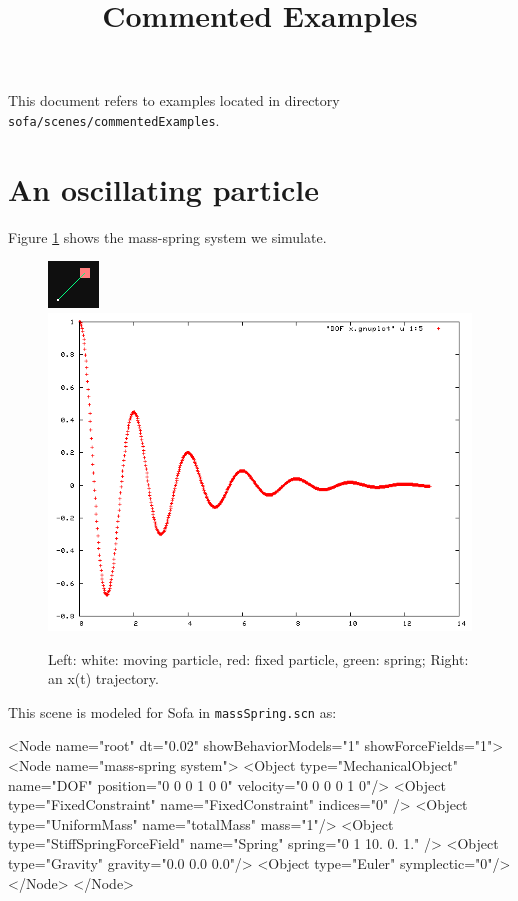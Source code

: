 \documentclass[a4paper,11pt]{article}
\title{Commented Examples}
\author{
}
\newcommand{\file}[1]{\texttt{#1}}
\begin{document}
\maketitle

% 

This document refers to examples located in directory \texttt{sofa/scenes/commentedExamples}.

\tableofcontents

\section{An oscillating particle}
Figure \ref{fig:massSpring} shows the mass-spring system we simulate.
\begin{figure}[ht]
	\centering
	\includegraphics[width=0.4\linewidth]{massSpring01}
 \includegraphics[height=0.4\linewidth]{euler_damped_ok}
	\caption{Left: white: moving particle, red: fixed particle, green: spring; Right: an x(t) trajectory.}
	\label{fig:massSpring}
\end{figure}

This scene is modeled for Sofa in \file{massSpring.scn} as:
\begin{code_xml}
<Node name="root" dt="0.02" showBehaviorModels="1" showForceFields="1">
   <Node name="mass-spring system">
      <Object type="MechanicalObject" name="DOF" position="0 0 0  1 0 0" velocity="0 0 0  0 1 0"/>
      <Object type="FixedConstraint" name="FixedConstraint" indices="0" />
      <Object type="UniformMass" name="totalMass" mass="1"/>
      <Object type="StiffSpringForceField" name="Spring" spring="0 1 10. 0. 1." />
      <Object type="Gravity" gravity="0.0 0.0 0.0"/>
      <Object type="Euler" symplectic="0"/>
   </Node>
</Node>
\end{code_xml}
\end{document}
